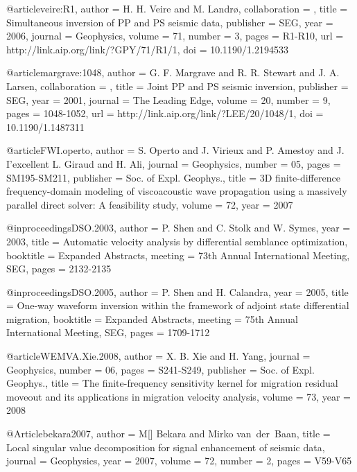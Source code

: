 @article{veire:R1,
author = {H. H. Veire and M. Landr\o},
collaboration = {},
title = {Simultaneous inversion of {PP} and {PS} seismic data},
publisher = {SEG},
year = {2006},
journal = {Geophysics},
volume = {71},
number = {3},
pages = {R1-R10},
url = {http://link.aip.org/link/?GPY/71/R1/1},
doi = {10.1190/1.2194533}
}

@article{margrave:1048,
author = {G. F. Margrave and R. R. Stewart and J. A. Larsen},
collaboration = {},
title = {Joint {PP} and {PS} seismic inversion},
publisher = {SEG},
year = {2001},
journal = {The Leading Edge},
volume = {20},
number = {9},
pages = {1048-1052},
url = {http://link.aip.org/link/?LEE/20/1048/1},
doi = {10.1190/1.1487311}
}







@article{FWI.operto,
  author = { S. Operto and J. Virieux and P. Amestoy and J.
I'excellent L. Giraud and H. Ali},
  journal = {Geophysics},
  number = {05},
  pages = {SM195-SM211},
  publisher = {Soc. of Expl. Geophys.},
  title = { 3{D} finite-difference frequency-domain modeling of
viscoacoustic wave propagation using a massively parallel direct
solver: A feasibility study},
  volume = {72},
  year = {2007}}

@inproceedings{DSO.2003,
  author    = {P. Shen and C. Stolk and W. Symes},
  year      = {2003},
  title     = {Automatic velocity analysis by differential semblance
optimization},
  booktitle = {Expanded Abstracts},
  meeting   = {73th Annual International Meeting, SEG},
  pages     = {2132-2135}
}

@inproceedings{DSO.2005,
  author    = {P. Shen and H. Calandra},
  year      = {2005},
  title     = {One-way waveform inversion within the framework of
adjoint state differential migration},
  booktitle = {Expanded Abstracts},
  meeting   = {75th Annual International Meeting, SEG},
  pages     = {1709-1712}
}

@article{WEMVA.Xie.2008,
  author = { X. B. Xie and H. Yang},
  journal = {Geophysics},
  number = {06},
  pages = {S241-S249},
  publisher = {Soc. of Expl. Geophys.},
  title = {The finite-frequency sensitivity kernel for migration
residual moveout and its applications in migration velocity analysis},
  volume = {73},
  year = {2008}}

%
@Article{bekara2007,
  author = 	 {M[] Bekara and Mirko van~der~Baan},
  title = 	 {Local singular value decomposition for signal enhancement of seismic data},
  journal = 	 {Geophysics},
  year = 	 2007,
  volume = 	 72,
  number = 	 2,
  pages = 	 {V59-V65}}

